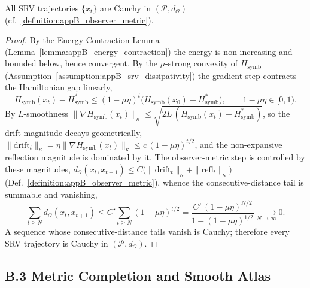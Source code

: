 \begin{theorem}
\label{theorem:appB_srv_cauchy}
All SRV trajectories $\{x_t\}$ are Cauchy in $(\mathcal{P}, d_{\mathcal{O}})$ (cf.~\ref{definition:appB_observer_metric}).
\end{theorem}
\begin{proof}
\label{proof:appB_srv_cauchy}
\leavevmode
By the Energy Contraction Lemma (Lemma~\ref{lemma:appB_energy_contraction}) the energy is non-increasing and bounded below, hence convergent. By the $\mu$-strong convexity of $H_{\text{symb}}$ (Assumption~\ref{assumption:appB_srv_dissipativity}) the gradient step contracts the Hamiltonian gap linearly,
\[
H_{\text{symb}}(x_t)-H_{\text{symb}}^{\ast}\le (1-\mu\eta)^{t}\big(H_{\text{symb}}(x_0)-H_{\text{symb}}^{\ast}\big),\qquad 1-\mu\eta\in[0,1).
\]
By $L$-smoothness $\|\nabla H_{\text{symb}}(x_t)\|_\kappa\le\sqrt{2L\,(H_{\text{symb}}(x_t)-H_{\text{symb}}^{\ast})}$, so the drift magnitude decays geometrically, $\|\text{drift}_t\|_\kappa=\eta\|\nabla H_{\text{symb}}(x_t)\|_\kappa\le c\,(1-\mu\eta)^{t/2}$, and the non-expansive reflection magnitude is dominated by it. The observer-metric step is controlled by these magnitudes, $d_{\mathcal{O}}(x_t,x_{t+1})\le C\big(\|\text{drift}_t\|_\kappa+\|\text{refl}_t\|_\kappa\big)$ (Def.~\ref{definition:appB_observer_metric}), whence the consecutive-distance tail is summable and vanishing,
\[
\sum_{t\ge N} d_{\mathcal{O}}(x_t,x_{t+1})\le C'\sum_{t\ge N}(1-\mu\eta)^{t/2}=\frac{C'\,(1-\mu\eta)^{N/2}}{1-(1-\mu\eta)^{1/2}}\xrightarrow[N\to\infty]{}0 .
\]
A sequence whose consecutive-distance tails vanish is Cauchy; therefore every SRV trajectory is Cauchy in $(\mathcal{P},d_{\mathcal{O}})$.
\end{proof}

\subsection*{B.3 Metric Completion and Smooth Atlas}
\label{subsec:appB_smooth_completion}

